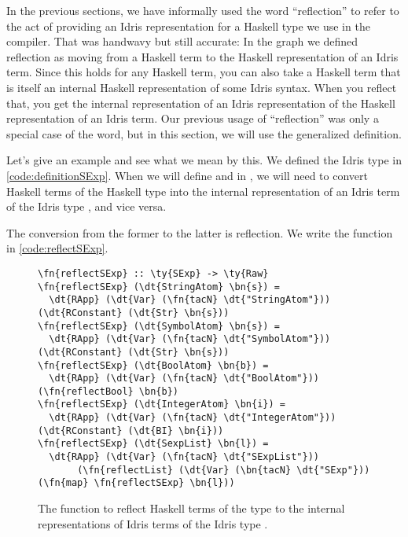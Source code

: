 In the previous sections, we have informally used the word ``reflection'' to
refer to the act of providing an Idris representation for a Haskell type we use
in the compiler.  That was handwavy but still accurate: In the graph we defined
reflection as moving from a Haskell term to the Haskell representation of an
Idris term. Since this holds for any Haskell term, you can also take a Haskell
term that is itself an internal Haskell representation of some Idris syntax.
When you reflect that, you get the internal representation of an Idris
representation of the Haskell representation of an Idris term.  Our previous
usage of ``reflection'' was only a special case of the word, but in this
section, we will use the generalized definition.

Let's give an example and see what we mean by this.
We defined the Idris type  in \autoref{code:definitionSExp}.
When we will define  and  in \label{sec:primitiveEditorableImpl},
we will need to convert Haskell terms of the Haskell type  into the
internal representation of an Idris term of the Idris type , and vice
versa.

The conversion from the former to the latter is reflection. We write the
function  in \autoref{code:reflectSExp}.

\begin{figure}[ht]
\caption{The function to reflect Haskell terms of the type  to the
internal representations of Idris terms of the Idris type .}
\label{code:reflectSExp}
\begin{Verbatim}[framesep=2mm, label=\footnotesize{\normalfont{Haskell}}, labelposition=topline]
\fn{reflectSExp} :: \ty{SExp} -> \ty{Raw}
\fn{reflectSExp} (\dt{StringAtom} \bn{s}) =
  \dt{RApp} (\dt{Var} (\fn{tacN} \dt{"StringAtom"})) (\dt{RConstant} (\dt{Str} \bn{s}))
\fn{reflectSExp} (\dt{SymbolAtom} \bn{s}) =
  \dt{RApp} (\dt{Var} (\fn{tacN} \dt{"SymbolAtom"})) (\dt{RConstant} (\dt{Str} \bn{s}))
\fn{reflectSExp} (\dt{BoolAtom} \bn{b}) =
  \dt{RApp} (\dt{Var} (\fn{tacN} \dt{"BoolAtom"})) (\fn{reflectBool} \bn{b})
\fn{reflectSExp} (\dt{IntegerAtom} \bn{i}) =
  \dt{RApp} (\dt{Var} (\fn{tacN} \dt{"IntegerAtom"})) (\dt{RConstant} (\dt{BI} \bn{i}))
\fn{reflectSExp} (\dt{SexpList} \bn{l}) =
  \dt{RApp} (\dt{Var} (\fn{tacN} \dt{"SExpList"}))
       (\fn{reflectList} (\dt{Var} (\bn{tacN} \dt{"SExp"})) (\fn{map} \fn{reflectSExp} \bn{l}))
\end{Verbatim}
\end{figure}

